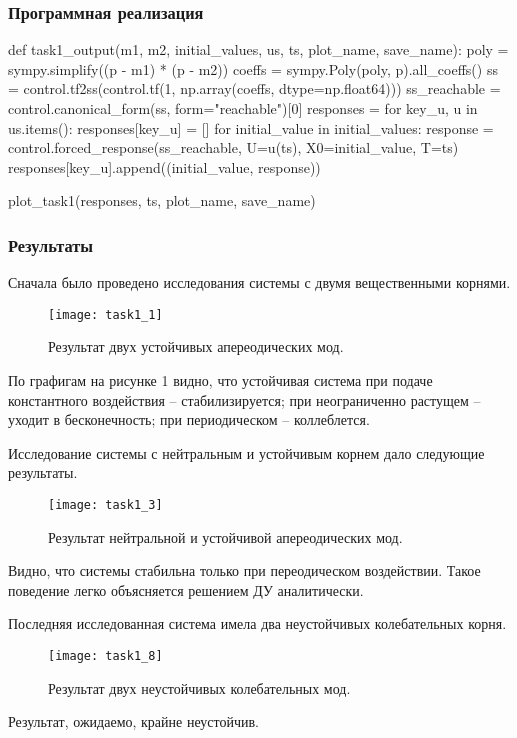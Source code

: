 \documentclass[16pt]{article}
\begin{document}
\subsubsection{Программная реализация}
\begin{python}
def task1_output(m1, m2, initial_values, us, ts, plot_name, save_name):
    poly = sympy.simplify((p - m1) * (p - m2))
    coeffs = sympy.Poly(poly, p).all_coeffs()
    ss = control.tf2ss(control.tf(1, np.array(coeffs, dtype=np.float64)))
    ss_reachable = control.canonical_form(ss, form="reachable")[0]
    responses = {}
    for key_u, u in us.items():
        responses[key_u] = []
        for initial_value in initial_values:
            response = control.forced_response(ss_reachable, U=u(ts), X0=initial_value, T=ts)
            responses[key_u].append((initial_value, response))
    
    plot_task1(responses, ts, plot_name, save_name)
\end{python}
\subsubsection{Результаты}
Сначала было проведено исследования системы с двумя вещественными корнями.
\begin{figure}[h]
    \centering
    \texttt{[image: task1\_1]}
    \caption{Результат двух устойчивых апереодических мод.}
    \label{fig:fig1}
\end{figure}


По графигам на рисунке 1 видно, что устойчивая система при подаче константного воздействия -- стабилизируется; при неограниченно растущем -- уходит в бесконечность; при периодическом -- коллеблется.

Исследование системы с нейтральным и устойчивым корнем дало следующие результаты.
\begin{figure}[h]
    \centering
    \texttt{[image: task1\_3]}
    \caption{Результат нейтральной и устойчивой апереодических мод.}
    \label{fig:fig2}
\end{figure}
Видно, что системы стабильна только при переодическом воздействии. Такое поведение легко объясняется решением ДУ аналитически.

Последняя исследованная система имела два неустойчивых колебательных корня.
\begin{figure}[h]
    \centering
    \texttt{[image: task1\_8]}
    \caption{Результат двух неустойчивых колебательных мод.}
    \label{fig:fig3}
\end{figure}
Результат, ожидаемо, крайне неустойчив.
\end{document}
